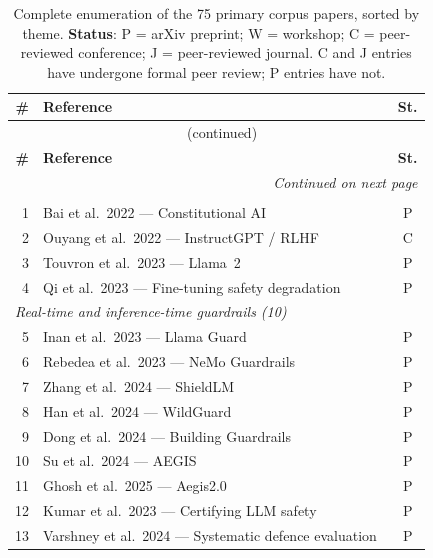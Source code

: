 \small
\begin{longtable}{rp{12.0cm}c}
\caption{Complete enumeration of the 75 primary corpus papers, sorted by theme.
         \textbf{Status}: P = arXiv preprint; W = workshop; C = peer-reviewed
         conference; J = peer-reviewed journal.
         C and J entries have undergone formal peer review; P entries have not.}
\label{tab:corpus} \\
\toprule
\textbf{\#} & \textbf{Reference} & \textbf{St.} \\
\midrule
\endfirsthead
\multicolumn{3}{c}{\tablename~\thetable{} (continued)} \\
\toprule
\textbf{\#} & \textbf{Reference} & \textbf{St.} \\
\midrule
\endhead
\midrule
\multicolumn{3}{r}{\itshape Continued on next page} \\
\endfoot
\bottomrule
\endlastfoot
    \multicolumn{3}{l}{\textit{Alignment foundations and intrinsic safety (4)}} \\
    1  & Bai et al.\ 2022 — Constitutional AI~\cite{bai2022constitutional} & P \\
    2  & Ouyang et al.\ 2022 — InstructGPT / RLHF~\cite{ouyang2022training} & C \\
    3  & Touvron et al.\ 2023 — Llama~2~\cite{touvron2023llama2} & P \\
    4  & Qi et al.\ 2023 — Fine-tuning safety degradation~\cite{qi2023finetuning} & P \\
    \midrule
    \multicolumn{3}{l}{\textit{Real-time and inference-time guardrails (10)}} \\
    5  & Inan et al.\ 2023 — Llama Guard~\cite{inan2023llama} & P \\
    6  & Rebedea et al.\ 2023 — NeMo Guardrails~\cite{rebedea2023nemo} & P \\
    7  & Zhang et al.\ 2024 — ShieldLM~\cite{zhang2024shieldlm} & P \\
    8  & Han et al.\ 2024 — WildGuard~\cite{han2024wildguard} & P \\
    9  & Dong et al.\ 2024 — Building Guardrails~\cite{dong2024building} & P \\
    10 & Su et al.\ 2024 — AEGIS~\cite{su2024aegis} & P \\
    11 & Ghosh et al.\ 2025 — Aegis2.0~\cite{ghosh2024aegis2} & P \\
    12 & Kumar et al.\ 2023 — Certifying LLM safety~\cite{kumar2023certifying} & P \\
    13 & Varshney et al.\ 2024 — Systematic defence evaluation~\cite{varshney2023art} & P \\

\end{longtable}
